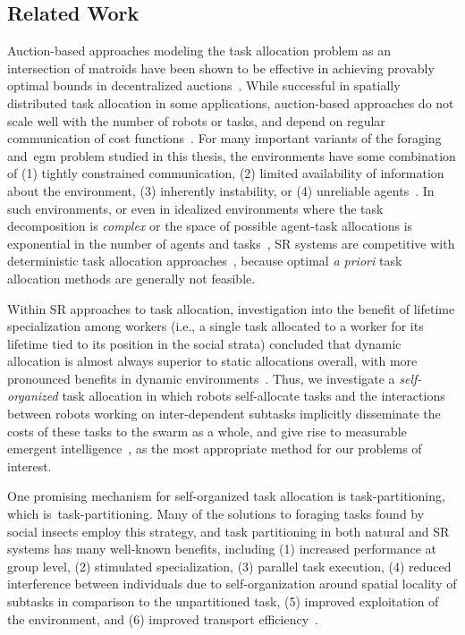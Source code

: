 \subsection{Related Work}\label{RQ2:sec:rw}
%

Auction-based approaches modeling the task allocation problem as an intersection
of matroids have been shown to be effective in achieving provably optimal bounds
in decentralized auctions~\cite{Williams2017}. While successful in spatially
distributed task allocation in some applications, auction-based approaches do
not scale well with the number of robots or tasks, and depend on regular
communication of cost functions~\cite{Hsieh2008}. For many important variants of
the foraging and~\gls{egm} problem studied in this thesis, the environments have
some combination of (1) tightly constrained communication, (2) limited
availability of information about the environment, (3) inherently instability,
or (4) unreliable agents~\cite{Rouff2007a,Napp2014a}.  In such environments, or
even in idealized environments where the task decomposition is \emph{complex} or
the space of possible agent-task allocations is exponential in the number of
agents and tasks~\cite{Korsah2013}, SR systems are competitive with
deterministic task allocation approaches~\cite{Correll2008}, because optimal
\emph{a priori} task allocation methods are generally not feasible.

Within SR approaches to task allocation, investigation into the benefit of
lifetime specialization among workers (i.e., a single task allocated to a worker
for its lifetime tied to its position in the social strata) concluded that
dynamic allocation is almost always superior to static allocations overall, with
more pronounced benefits in dynamic environments~\cite{Ferrante2015}.
Thus, we investigate a \emph{self-organized} task allocation in which robots
self-allocate tasks and the interactions between robots working on
inter-dependent subtasks implicitly disseminate the costs of these tasks to the
swarm as a whole, and give rise to measurable emergent
intelligence~\cite{Harwell2019a},  as the most appropriate method for our
problems of interest.

%
One promising mechanism for self-organized task allocation is
\gls{task-partitioning}, which is~\glsdesc{task-partitioning}. Many of the
solutions to foraging tasks found by social insects employ this strategy, and
task partitioning in both natural and SR systems has many well-known benefits,
including (1) increased performance at group level, (2) stimulated
specialization, (3) parallel task execution, (4) reduced interference between
individuals due to self-organization around spatial locality of subtasks in
comparison to the unpartitioned task, (5) improved exploitation of the
environment, and (6) improved transport
efficiency~\cite{Hart2002,Pini2011b,Pini2011a}.

